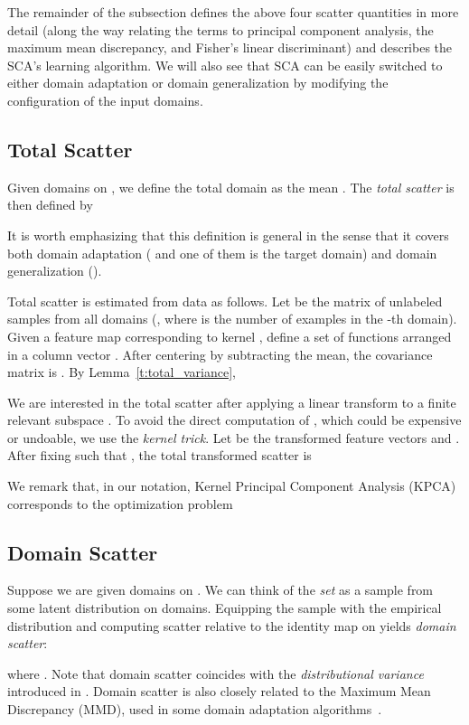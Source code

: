 \documentclass[10pt,journal,compsoc]{IEEEtran}
\begin{document}
The remainder of the subsection defines the above four scatter quantities in more detail (along the way relating the terms to principal component analysis, the maximum mean discrepancy, and Fisher's linear discriminant) and describes the SCA's learning algorithm.
We will also see that SCA can be easily switched to either domain adaptation or domain generalization by modifying the configuration of the input domains.


\subsection{Total Scatter}
Given  domains  on , we define the total domain as the mean .
The \emph{total scatter} is then defined by

It is worth emphasizing that this definition is general in the sense that it covers both domain adaptation ( and one of them is the target domain) and domain generalization ().

Total scatter is estimated from data as follows. 
Let  be the matrix of unlabeled samples from all  domains (, where  is the number of examples in the -th domain).
Given a feature map  corresponding to kernel , define a set of functions arranged in a column vector .
After centering  by subtracting the mean,
the covariance matrix is . By Lemma~\ref{t:total_variance}, 


We are interested in the total scatter after applying a linear transform to a finite relevant subspace .
To avoid the direct computation of , which could be expensive or undoable, we use the \emph{kernel trick}.
Let  be the  transformed feature vectors and
.
After fixing  such that , 
the total transformed scatter is 

We remark that, in our notation, Kernel Principal Component Analysis (KPCA)~\cite{Scholkopf1998} corresponds to the optimization problem



\subsection{Domain Scatter}
Suppose we are given  domains  on . 
We can think of the \emph{set}  as a sample from some latent distribution on domains. Equipping the sample with the empirical distribution and computing scatter relative to the identity map on  yields \emph{domain scatter}:

where .
Note that domain scatter coincides with the \emph{distributional variance} introduced in \cite{Muandet2013}.
Domain scatter is also closely related to the Maximum Mean Discrepancy (MMD), used in some domain adaptation algorithms~\cite{Huang:2007,Pan2011,Long2014a}.
\end{document}
